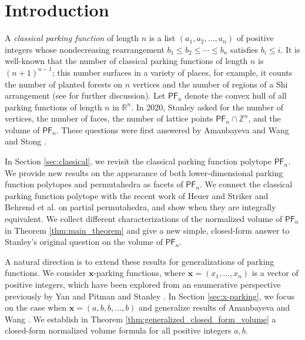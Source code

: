 \documentclass[11pt]{amsart}
\theoremstyle{definition}
\newcommand{\0}{\emptyset}
\newcommand{\R}{\mathbb{R}}
\newcommand{\Z}{\mathbb{Z}}
\newcommand{\PF}{\mathsf{PF}}
\begin{document}
\maketitle

\section{Introduction}

A \textit{classical parking function} of length $n$ is a list $(a_1, a_2, \ldots, a_n)$ of positive integers whose nondecreasing rearrangement $b_1 \leq b_2 \leq \cdots \leq b_n$ satisfies $b_i \leq i$. 
It is well-known that the number of classical parking functions of length $n$ is $(n+1)^{n-1}$; this number surfaces in a variety of places, for example, it counts the number of planted forests on $n$ vertices 
and the number of regions of a Shi arrangement (see \cite{Bon} for further discussion).
Let $\PF_n$ denote the convex hull of all parking functions of length $n$ in $\R^n$.
In 2020, Stanley \cite{Sta} asked for the number of vertices, the number of faces, the number of lattice points $ \PF_n \cap \Z^n$, and the volume of $\PF_n$. 
These questions were first answered by Amanbayeva and Wang \cite{AW} and Stong \cite{Sto}.

In Section \ref{sec:classical}, we revisit the classical parking function polytope $\PF_n$. 
We provide new results on the appearance of both lower-dimensional parking function polytopes and permutahedra as facets of $\PF_n$.
We connect the classical parking function polytope with the recent work of Heuer and Striker \cite{HS} and Behrend et al. \cite{BCC} on partial permutahedra, and show when they are integrally equivalent. 
We collect different characterizations of the normalized volume of $\PF_n$ in Theorem \ref{thm:main_theorem} and give a new simple, closed-form answer to Stanley's original question on the volume of $\PF_n$.

A natural direction is to extend these results for generalizations of parking functions.
We consider $\mathbf{x}$-parking functions, where $\mathbf{x}=(x_1,\ldots,x_n)$ is a vector of positive integers, which have been explored from an enumerative perspective previously by Yan \cite{Yan2, Yan, Bon} and Pitman and Stanley \cite{PitmanStanley}.
In Section \ref{sec:x-parking}, we focus on the case when $\mathbf{x} = (a,b,b,\ldots, b)$ and generalize results of Amanbayeva and Wang \cite{AW}. 
We establish in Theorem \ref{thm:generalized_closed_form_volume} a closed-form normalized volume formula for all positive integers $a,b$.
\end{document}
